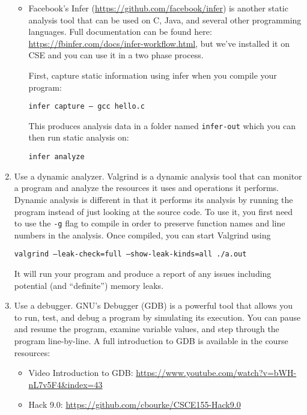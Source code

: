 \documentclass[12pt]{scrartcl}
\begin{document}
\begin{enumerate}
\begin{itemize}
    \item Facebook's Infer (\url{https://github.com/facebook/infer}) 
    is another static analysis tool that can be used on C, Java, and 
    several other programming languages.  Full documentation can be
    found here: \url{https://fbinfer.com/docs/infer-workflow.html}, but
    we've installed it on CSE and you can use it in a two phase process.
    
    First, capture static information using infer when you compile your
    program: 
     
    \texttt{infer capture -- gcc hello.c}

    This produces analysis data in a folder named \texttt{infer-out}
    which you can then run static analysis on: 

    \texttt{infer analyze}


  \end{itemize}
  
  \item Use a dynamic analyzer.  Valgrind is a dynamic analysis tool 
  that can monitor a program and analyze the resources it uses and
  operations it performs.  Dynamic analysis is different in that it
  performs its analysis by running the program instead of just looking
  at the source code.  To use it, you first need to use the 
  \texttt{-g} flag to compile in order to preserve function
  names and line numbers in the analysis.  Once compiled, you can start
  Valgrind using
  
  \texttt{valgrind --leak-check=full --show-leak-kinds=all ./a.out}

  It will run your program and produce a report of any issues including
  potential (and ``definite'') memory leaks.

  \item Use a debugger.  GNU's Debugger (GDB) is a powerful tool that
  allows you to run, test, and debug a program by simulating its execution.
  You can pause and resume the program, examine variable values, and
  step through the program line-by-line.  A full introduction to GDB
  is available in the course resources:
  \begin{itemize}
    \item Video Introduction to GDB: \url{https://www.youtube.com/watch?v=bWH-nL7v5F4&index=43}
    \item Hack 9.0: \url{https://github.com/cbourke/CSCE155-Hack9.0}
  \end{itemize}
  

\end{enumerate}
\end{document}
